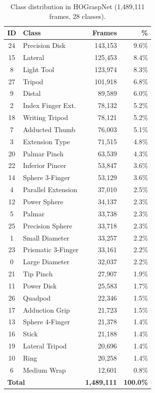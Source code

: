 \documentclass[letterpaper, 10 pt, conference]{ieeeconf}  %
\begin{document}
\begin{table}[h]
\centering
\caption{Class distribution in HOGraspNet (1,489,111 frames, 28 classes).}
\label{tab:hograspnet_distribution}
\begin{tabular}{clrr}
\toprule
ID & Class & Frames & \% \\
\midrule
24 & Precision Disk       & 143,153 & 9.6\% \\
15 & Lateral              & 125,453 & 8.4\% \\
8  & Light Tool           & 123,974 & 8.3\% \\
27 & Tripod               & 101,918 & 6.8\% \\
9  & Distal               &  89,589 & 6.0\% \\
2  & Index Finger Ext.    &  78,132 & 5.2\% \\
18 & Writing Tripod       &  78,121 & 5.2\% \\
7  & Adducted Thumb       &  76,003 & 5.1\% \\
3  & Extension Type       &  71,515 & 4.8\% \\
20 & Palmar Pinch         &  63,539 & 4.3\% \\
22 & Inferior Pincer      &  53,847 & 3.6\% \\
14 & Sphere 3-Finger      &  53,129 & 3.6\% \\
4  & Parallel Extension   &  37,010 & 2.5\% \\
12 & Power Sphere         &  34,137 & 2.3\% \\
5  & Palmar               &  33,738 & 2.3\% \\
25 & Precision Sphere     &  33,718 & 2.3\% \\
1  & Small Diameter       &  33,257 & 2.2\% \\
23 & Prismatic 3-Finger   &  33,161 & 2.2\% \\
0  & Large Diameter       &  32,037 & 2.2\% \\
21 & Tip Pinch            &  27,907 & 1.9\% \\
11 & Power Disk           &  25,583 & 1.7\% \\
26 & Quadpod              &  22,346 & 1.5\% \\
17 & Adduction Grip       &  21,723 & 1.5\% \\
13 & Sphere 4-Finger      &  21,378 & 1.4\% \\
16 & Stick                &  21,188 & 1.4\% \\
19 & Lateral Tripod       &  20,696 & 1.4\% \\
10 & Ring                 &  20,258 & 1.4\% \\
6  & Medium Wrap          &  12,601 & 0.8\% \\
\midrule
\multicolumn{2}{l}{\textbf{Total}} & \textbf{1,489,111} & \textbf{100.0\%} \\
\bottomrule
\end{tabular}
\end{table}
\end{document}

